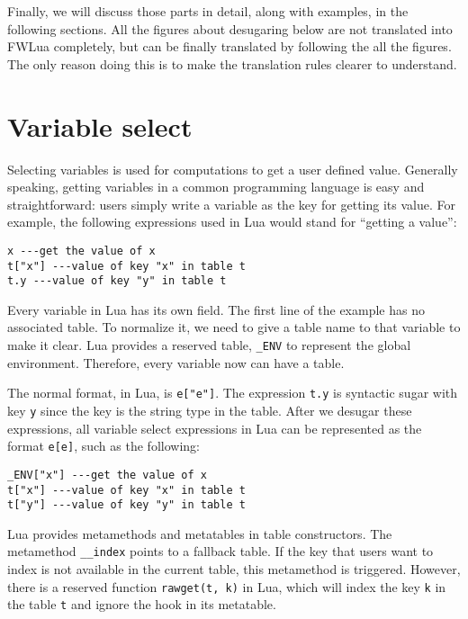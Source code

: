 Finally, we will discuss those parts in detail, along with examples, in the following sections. All the figures about desugaring below are not translated into FWLua completely, but can be finally translated by following the all the figures. The only reason doing this is to make the translation rules clearer to understand.



\section{Variable select}
Selecting variables is used for computations to get a user defined value. Generally speaking, getting variables in a common programming language is easy and straightforward: users simply write a variable as the key for getting its value. For example, the following expressions used in Lua would stand for ``getting a value'':

\begin{verbatim}
x ---get the value of x
t["x"] ---value of key "x" in table t
t.y ---value of key "y" in table t
\end{verbatim}

Every variable in Lua has its own field. 
The first line of the example has no associated table.
To normalize it, we need to give a table name to that variable to make it clear.
Lua provides a reserved table, {\tt \_ENV} to represent the global environment. Therefore, every variable now can have a table.

The normal format, in Lua, is {\tt e["e"]}. 
The expression {\tt t.y} is syntactic sugar with key {\tt y} since the key is the string type in the table. After we desugar these expressions, all variable select expressions in Lua can be represented as the format {\tt e[e]}, such as the following:

\begin{verbatim}
_ENV["x"] ---get the value of x
t["x"] ---value of key "x" in table t
t["y"] ---value of key "y" in table t
\end{verbatim}

Lua provides metamethods and metatables in table constructors. The metamethod {\tt \_\_index} points to a fallback table. If the key that users want to index is not available in the current table, this metamethod is triggered. However, there is a reserved function {\tt rawget(t, k)} in Lua, which will index the key {\tt k} in the table {\tt t} and ignore the hook in its metatable.

